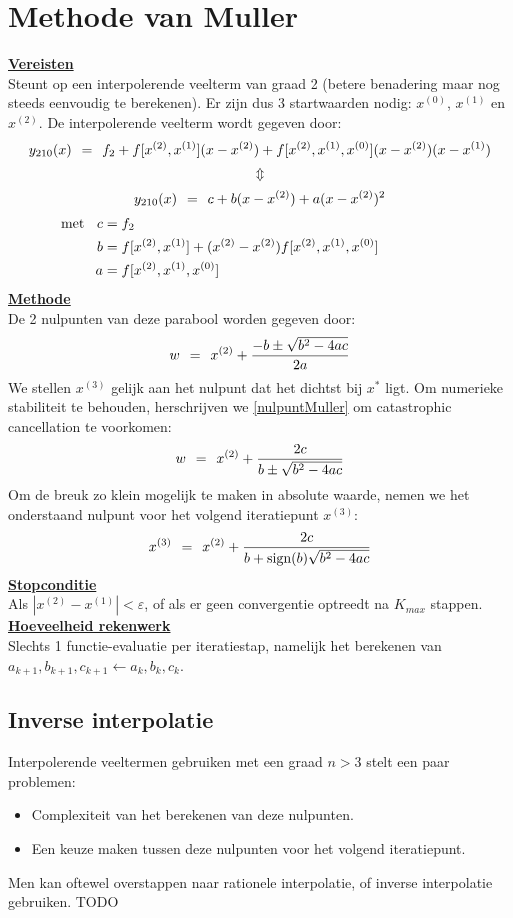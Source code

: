 \documentclass[11pt]{report}
\def \eq {\hspace{1.5mm}=\hspace{1.5mm}}
\def \h {\hspace{2mm}}
\def \H {\hspace{1cm}}
\def \v {\vspace{2mm}}
\def \updown {$$\Updownarrow$$}
\begin{document}
\section{Methode van Muller}
	\underline{\textbf{Vereisten}}\\
	Steunt op een interpolerende veelterm van graad 2 (betere benadering maar nog steeds eenvoudig te berekenen). Er zijn dus 3 startwaarden nodig: $x^{(0)}$, $x^{(1)}$ en $x^{(2)}$. De interpolerende veelterm wordt gegeven door:
	$$y_{210}(x) \eq f_2 + f[x^{(2)}, x^{(1)}](x - x^{(2)}) + f[x^{(2)}, x^{(1)}, x^{(0)}](x - x^{(2)})(x - x^{(1)})$$
	\updown
	\begin{equation}
		y_{210}(x) \eq c + b(x - x^{(2)}) + a(x - x^{(2)})^2
	\end{equation}
		\begin{align*}
		\text{met \h} c &= f_2\\
		b &= f[x^{(2)}, x^{(1)}] + (x^{(2)} - x^{(2)})f[x^{(2)}, x^{(1)}, x^{(0)}] \H\H\\
		a &= f[x^{(2)}, x^{(1)}, x^{(0)}]
	\end{align*}
	\underline{\textbf{Methode}}\\
	De 2 nulpunten van deze parabool worden gegeven door:
	\begin{equation}\label{nulpuntMuller}
		w \eq x^{(2)} + \frac{-b \pm \sqrt{b^2 - 4ac}}{2a}
	\end{equation}
	We stellen $x^{(3)}$ gelijk aan het nulpunt dat het dichtst bij $x^*$ ligt.
	Om numerieke stabiliteit te behouden, herschrijven we \ref{nulpuntMuller} om catastrophic cancellation te voorkomen:
	$$w \eq x^{(2)} + \frac{2c}{b\pm \sqrt{b^2 - 4ac}}$$
	Om de breuk zo klein mogelijk te maken in absolute waarde, nemen we het onderstaand nulpunt voor het volgend iteratiepunt $x^{(3)}$:
	\begin{equation}
		x^{(3)} \eq x^{(2)} + \frac{2c}{b + \text{sign}(b)\sqrt{b^2 - 4ac}}
	\end{equation}
	\underline{\textbf{Stopconditie}}\\
	Als $|x^{(2)} - x^{(1)}| < \varepsilon$, of als er geen convergentie optreedt na $K_{max}$ stappen.\v\\
	\underline{\textbf{Hoeveelheid rekenwerk}}\\
	Slechts 1 functie-evaluatie per iteratiestap, namelijk het berekenen van\\
	$a_{k+1}, b_{k+1}, c_{k+1} \leftarrow a_k, b_k, c_k$. 
	
\subsection{Inverse interpolatie}
	Interpolerende veeltermen gebruiken met een graad $n > 3$ stelt een paar problemen:
	\begin{itemize}
		\item Complexiteit van het berekenen van deze nulpunten.
		\item Een keuze maken tussen deze nulpunten voor het volgend iteratiepunt.
	\end{itemize}
	Men kan oftewel overstappen naar rationele interpolatie, of inverse interpolatie gebruiken. TODO
	
\end{document}
